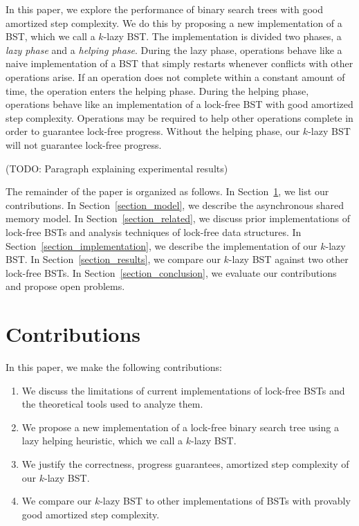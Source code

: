 \documentclass[letterpaper]{article}
\begin{document}
In this paper, we explore the performance of binary search trees with good amortized step complexity. We do this by proposing a new implementation of a BST, which we call a $k$-lazy BST. The implementation is divided two phases, a \textit{lazy phase} and a \textit{helping phase}. During the lazy phase, operations behave like a naive implementation of a BST that simply restarts whenever conflicts with other operations arise. If an operation does not complete within a constant amount of time, the operation enters the helping phase. During the helping phase, operations behave like an implementation of a lock-free BST with good amortized step complexity. Operations may be required to help other operations complete in order to guarantee lock-free progress. Without the helping phase, our $k$-lazy BST will not guarantee lock-free progress.

(TODO: Paragraph explaining experimental results)

The remainder of the paper is organized as follows. In Section~\ref{section_contribution}, we list our contributions. In Section~\ref{section_model}, we describe the asynchronous shared memory model. In Section~\ref{section_related}, we discuss prior implementations of lock-free BSTs and analysis techniques of lock-free data structures. In Section~\ref{section_implementation}, we describe the implementation of our $k$-lazy BST. In Section~\ref{section_results}, we compare our $k$-lazy BST against two other lock-free BSTs. In Section~\ref{section_conclusion}, we evaluate our contributions and propose open problems.

\section{Contributions}\label{section_contribution}
In this paper, we make the following contributions:
\begin{enumerate}
	\item We discuss the limitations of current implementations of lock-free BSTs and the theoretical tools used to analyze them.
	\item We propose a new implementation of a lock-free binary search tree using a lazy helping heuristic, which we call a $k$-lazy BST. 
	\item We justify the correctness, progress guarantees, amortized step complexity of our $k$-lazy BST.
	\item We compare our $k$-lazy BST to other implementations of BSTs with provably good amortized step complexity.
\end{enumerate}
\end{document}
